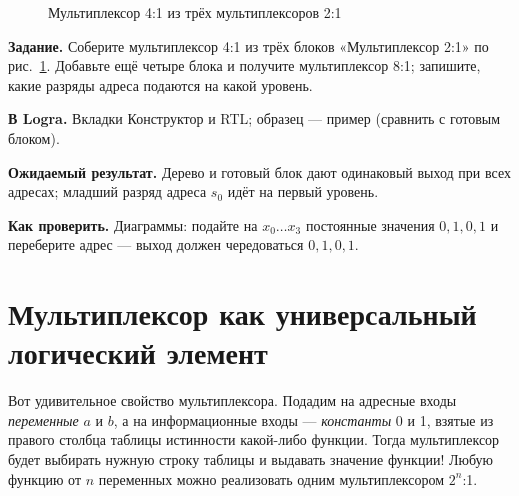 \begin{figure}[H]
\centering
{}
\caption{Мультиплексор 4:1 из трёх мультиплексоров 2:1}
\label{fig:muxtree}
\end{figure}

\begin{diybox}
\textbf{Задание.}  Соберите мультиплексор 4:1 из трёх блоков
«Мультиплексор 2:1» по рис.~\ref{fig:muxtree}.  Добавьте ещё четыре
блока и получите мультиплексор 8:1; запишите, какие разряды адреса подаются на
какой уровень.

\textbf{В Logra.} Вкладки Конструктор и RTL; образец --- пример 
(сравнить с готовым блоком).

\textbf{Ожидаемый результат.} Дерево и готовый блок дают одинаковый выход при
всех адресах; младший разряд адреса $s_0$ идёт на первый уровень.

\textbf{Как проверить.} Диаграммы: подайте на $x_0\ldots x_3$ постоянные
значения $0,1,0,1$ и переберите адрес --- выход должен чередоваться
$0,1,0,1$.
\end{diybox}

\section{Мультиплексор как универсальный логический элемент}

Вот удивительное свойство мультиплексора. Подадим на адресные входы
\emph{переменные} $a$ и $b$, а на информационные входы --- \emph{константы}
0 и 1, взятые из правого столбца таблицы истинности какой-либо функции. Тогда
мультиплексор будет выбирать нужную строку таблицы и выдавать значение
функции! Любую функцию от $n$ переменных можно реализовать одним
мультиплексором $2^n$:1.

